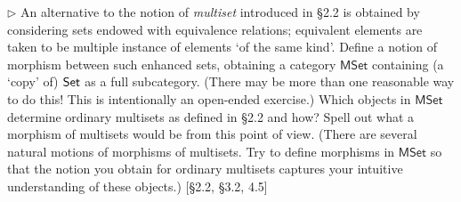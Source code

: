 \hypertarget{Exercise I.3.9}{}
\begin{problem}[3.9]	
	$\rhd$ An alternative to the notion of \textit{multiset} introduced in
	\S2.2 is obtained by considering sets endowed with equivalence relations;
	equivalent elements are taken to be multiple instance of elements `of the same
	kind'. Define a notion of morphism between such enhanced sets, obtaining a
	category ${\mathsf{MSet}}$ containing (a `copy' of) $\mathsf{Set}$ as a full subcategory. (There
	may be more than one reasonable way to do this! This is intentionally an
	open-ended exercise.) Which objects in $\mathsf{MSet}$ determine ordinary multisets as
	defined in \S2.2 and how? Spell out what a morphism of multisets would be from
	this point of view. (There are several natural motions of morphisms of
	multisets. Try to define morphisms in $\mathsf{MSet}$ so that the notion you obtain for
	ordinary multisets captures your intuitive understanding of these objects.)
	[\S2.2, \S3.2, 4.5]
\end{problem}
